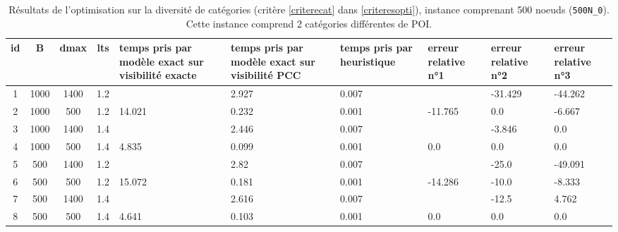 \begin{sidewaystable}
    \centering

    \caption{Résultats de l'optimisation sur la diversité de catégories (critère \ref{criterecat} dans \ref{criteresopti}), instance comprenant 500 noeuds (\texttt{500N\_0}). Cette instance comprend 2 catégories différentes de POI.}
    \label{tab:500div}
    \begin{tabular}{|c|c|c|c|p{3cm}|p{3cm}|p{3cm}|p{2cm}|p{2cm}|p{2cm}|}
    \hline
    id & B & dmax & lts & temps pris par
    modèle exact sur visibilité exacte & temps pris par
    modèle exact sur visibilité PCC & temps pris par
    heuristique & erreur relative n°1 & erreur relative n°2 & erreur relative n°3 \\
    \hline


    1 & 1000 & 1400 & 1.2 &  & 2.927 & 0.007 &  & -31.429 & -44.262 \\
    2 & 1000 & 500 & 1.2 & 14.021 & 0.232 & 0.001 & -11.765 & 0.0 & -6.667 \\
    3 & 1000 & 1400 & 1.4 &  & 2.446 & 0.007 &  & -3.846 & 0.0 \\
    4 & 1000 & 500 & 1.4 & 4.835 & 0.099 & 0.001 & 0.0 & 0.0 & 0.0 \\
    5 & 500 & 1400 & 1.2 &  & 2.82 & 0.007 &  & -25.0 & -49.091 \\
    6 & 500 & 500 & 1.2 & 15.072 & 0.181 & 0.001 & -14.286 & -10.0 & -8.333 \\
    7 & 500 & 1400 & 1.4 &  & 2.616 & 0.007 &  & -12.5 & 4.762 \\
    8 & 500 & 500 & 1.4 & 4.641 & 0.103 & 0.001 & 0.0 & 0.0 & 0.0 \\
    \hline
    \end{tabular}


\end{sidewaystable}
